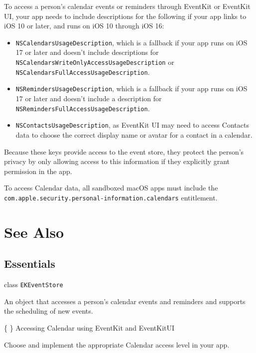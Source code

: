 \documentclass{article}
\begin{document}
\noindent{}

To access a person's calendar events or reminders through EventKit or EventKit UI, your app needs to include descriptions for the following if your app links to iOS 10 or later, and runs on iOS 10 through iOS 16:

\begin{itemize}
    \item \texttt{NSCalendarsUsageDescription}, which is a fallback if your app runs on iOS 17 or later and doesn't include descriptions for \texttt{NSCalendarsWriteOnlyAccessUsageDescription} or \texttt{NSCalendarsFullAccessUsageDescription}.
    \item \texttt{NSRemindersUsageDescription}, which is a fallback if your app runs on iOS 17 or later and doesn't include a description for \texttt{NSRemindersFullAccessUsageDescription}.
    \item \texttt{NSContactsUsageDescription}, as EventKit UI may need to access Contacts data to choose the correct display name or avatar for a contact in a calendar.
\end{itemize}

\noindent{}

Because these keys provide access to the event store, they protect the person's privacy by only allowing access to this information if they explicitly grant permission in the app.

To access Calendar data, all sandboxed macOS apps must include the \texttt{com.apple.security.personal-information.calendars} entitlement.

\section*{See Also}

\subsection*{Essentials}

class \texttt{EKEventStore}

An object that accesses a person's calendar events and reminders and supports the scheduling of new events.

\{ \} Accessing Calendar using EventKit and EventKitUI

Choose and implement the appropriate Calendar access level in your app.

\newpage
\end{document}
